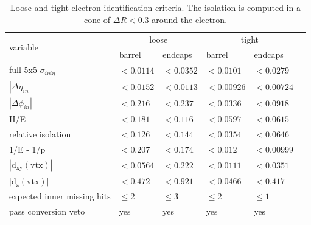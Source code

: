 \renewcommand{\arraystretch}{1.1}
\begin{table}[ht!]
\centering
\small
\begin{tabular}{|l|l|l||l|l|c|}
\hline
\multirow{2}{*}{variable}                             &  \multicolumn{2}{c||}{loose} &  \multicolumn{2}{c|}{tight} \\
\cline{2-5}
                                                            &  barrel        & endcaps  &  barrel  & endcaps\\
\hline
full 5x5 $\sigma_{i\eta i\eta}$                             & $< 0.0114  $     & $< 0.0352  $ & $< 0.0101  $     & $< 0.0279  $ \\
$|\Delta \eta_{in}|$                                        & $< 0.0152  $     & $< 0.0113  $ & $< 0.00926 $     & $< 0.00724 $ \\
$|\Delta \phi_{in}|$                                        & $< 0.216   $     & $< 0.237   $ & $< 0.0336  $     & $< 0.0918  $ \\
H/E                                                         & $< 0.181   $     & $< 0.116   $ & $< 0.0597  $     & $< 0.0615  $ \\
relative isolation			                    & $< 0.126   $     & $< 0.144   $ & $< 0.0354  $     & $< 0.0646  $ \\
1/E - 1/p                                                   & $< 0.207   $     & $< 0.174   $ & $< 0.012   $     & $< 0.00999 $ \\
$|\mathrm{d_{xy}(vtx)}|$                                    & $< 0.0564  $     & $< 0.222   $ & $< 0.0111  $     & $< 0.0351  $ \\
$|\mathrm{d_{z}(vtx)}|$                                     & $< 0.472   $     & $< 0.921   $ & $< 0.0466  $     & $< 0.417   $ \\
expected inner missing hits                                 & $\leq 2$         & $\leq 3$     & $\leq 2$           & $\leq 1$   \\
pass conversion veto                                        & yes              & yes          & yes              & yes        \\
\hline
\end{tabular}
\caption{Loose and tight electron identification criteria. The isolation is computed in a cone of $\Delta R < 0.3$ around the electron.}
\label{tab:ElectronID}
\end{table}

